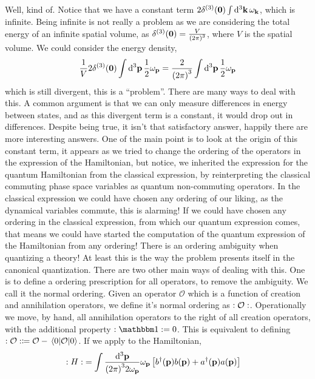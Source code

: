 Well, kind of. Notice that we have a constant term $2\delta^{\qty(3)}\qty(\vb 0)\int\dd[3]{\vb k}\omega_{\vb k}$, which is infinite. Being infinite is not really a problem as 
we are considering the total energy of an infinite spatial volume, as $\delta^{(3)}\qty(\vb 0)=\frac{V}{\qty(2\pi)^3}$, where $V$ is 
the spatial volume. We could consider the energy density,
\begin{align}
    \frac1V2\delta^{\qty(3)}\qty(\vb 0)\int\dd[3]{\vb p}\frac12\omega_{\vb p}=\frac{2}{\qty(2\pi)^3}\int\dd[3]{\vb p}\frac12\omega_{\vb p}
\end{align}
which is still divergent, this is a ``problem''. There are many ways to deal with this. A common argument is that we can only measure differences in energy between states, and as this divergent term is a constant, 
it would drop out in differences. Despite being true, it isn't that satisfactory answer, happily there are more interesting answers. One of the main point is to look at the origin of this constant term, it appears 
as we tried to change the ordering of the operators in the expression of the Hamiltonian, but notice, we inherited the expression for the quantum Hamiltonian from the classical expression, by reinterpreting the 
classical commuting phase space variables as quantum non-commuting operators. In the classical expression we could have chosen any ordering of our liking, as the dynamical variables commute, this is alarming! 
If we could have chosen any ordering in the classical expression, from which our quantum expression comes, that means we could have started the computation of the quantum expression of the Hamiltonian from 
any ordering! There is an ordering ambiguity when quantizing a theory! At least this is the way the problem presents itself in the canonical quantization. There are two other main ways of dealing with this. 
One is to define a ordering prescription for all operators, to remove the ambiguity. We call it the normal ordering. Given an operator $\mathcal O$ which is a function of creation and annihilation 
operators, we define it's normal ordering as $:\mathcal O:$. Operationally we move, by hand, all annihilation operators to the right of all creation operators, with the additional property $\cnord{\mathbbm1}=0$. 
This is equivalent to defining $:\mathcal O: \coloneq \mathcal O-\mel{0}{\mathcal O}{0}$. If we apply to the Hamiltonian,
\begin{align}
    :H:&=\int\frac{\dd[3]{\vb p}}{\qty(2\pi)^32\omega_{\vb p}}\omega_{\vb p}\left[b^\dagger\qty(\vb p)b\qty(\vb p)+ a^\dagger\qty(\vb p)a\qty(\vb p)\right]
\end{align}

